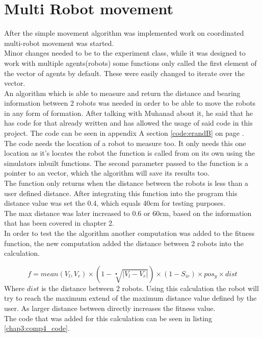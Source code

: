 \section{Multi Robot movement}
After the simple movement algorithm was implemented work on coordinated multi-robot movement was started.\\
Minor changes needed to be to the experiment class, while it was designed to work with multiple agents(robots) some functions only called the first element of the vector of agents by default. These were easily changed to iterate over the vector. \\

An algorithm which is able to measure and return the distance and bearing information between 2 robots was needed in order to be able to move the robots in any form of formation. After talking with Muhanad about it, he said that he has code for that already written and has allowed the usage of said code in this project. The code can be seen in appendix A section \ref{code:erandB} on page \pageref{code:erandB}.\\
The code needs the location of a robot to measure too. It only needs this one location as it's locates the robot the function is called from on its own using the simulators inbuilt functions.  The second parameter passed to the function is a pointer to an vector, which the algorithm will save its results too. \\
The function only returns when the distance between the robots is less than a user defined distance. After integrating this function into the program this distance value was set the 0.4, which equals 40cm for testing purposes. \\
The max distance was later increased to 0.6 or 60cm, based on the information that has been covered in chapter 2. \\

In order to test the the algorithm another computation was added to the fitness function, the new computation added the distance between 2 robots into the calculation.

\begin{equation}
f = mean(V_l, V_r) \times ( 1 - \sqrt[•]{|V_l - V_r|}) \times (1 - S_{ir}) \times pos_y \times dist
\end{equation}
Where $dist$ is the distance between 2 robots. Using this calculation the robot will try to reach the maximum extend of the maximum distance value defined by the user.
As larger distance between directly increases the fitness value. \\
The code that was added for this calculation can be seen in listing \ref{chap3:comp4_code}.

